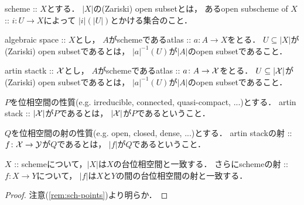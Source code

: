\begin{Def}
\begin{myenum}
    \item
        scheme :: $X$とする．
        $|X|$の(Zariski) open subsetとは，
        あるopen subscheme of $X$ :: $i \colon U \to X$によって
        $|i|(|U|)$とかける集合のこと．

    \item
        algebraic space :: $X$とし，
        $A$がschemeであるatlas :: $a \colon A \to X$をとる．
        $U \subseteq |X|$が(Zariski) open subsetであるとは，
        $|a|^{-1}(U)$が$|A|$のopen subsetであること．

    \item
        artin stactk :: $\mathcal{X}$とし，
        $A$がschemeであるatlas :: $a \colon A \to \mathcal{X}$をとる．
        $U \subseteq |\mathcal{X}|$が(Zariski) open subsetであるとは，
        $|a|^{-1}(U)$が$|A|$のopen subsetであること．
\end{myenum}
\end{Def}

\begin{Def}
    $P$を位相空間の性質(e.g. irreducible, connected, quasi-compact, ...)とする．
    artin stack :: $|\mathcal{X}|$が$P$であるとは，
    $|\mathcal{X}|$が$P$であるということ．

    $Q$を位相空間の射の性質(e.g. open, closed, dense, ...)とする．
    artin stackの射 :: $f \colon \mathcal{X} \to \mathcal{Y}$が$Q$であるとは，
    $|f|$が$Q$であるということ．
\end{Def}

\begin{Lemma}
    $X$ :: schemeについて，$|X|$は$X$の台位相空間と一致する．
    さらにschemeの射 :: $f \colon X \to Y$について，
    $|f|$は$X$と$Y$の間の台位相空間の射と一致する．
\end{Lemma}
\begin{proof}
    注意(\ref{rem:sch-points})より明らか．
\end{proof}


